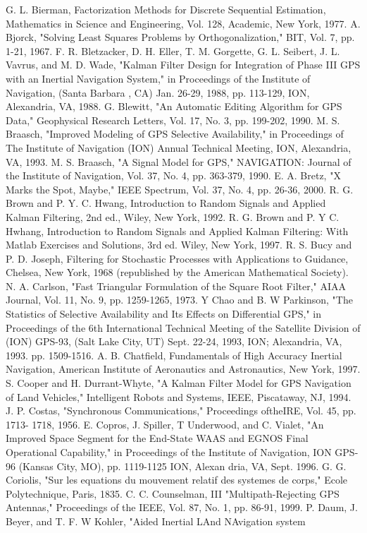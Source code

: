 \begin{thebibliography}{99}
 G. L. Bierman, Factorization Methods for Discrete Sequential Estimation, Mathematics
in Science and Engineering, Vol. 128, Academic, New York, 1977.
 A. Bjorck, "Solving Least Squares Problems by Orthogonalization," BIT, Vol. 7, pp.
1-21, 1967.
 F. R. Bletzacker, D. H. Eller, T. M. Gorgette, G. L. Seibert, J. L. Vavrus, and M. D. Wade,
"Kalman Filter Design for Integration of Phase III GPS with an Inertial Navigation
System," in Proceedings of the Institute of Navigation, (Santa Barbara , CA) Jan. 26-29,
1988, pp. 113-129, ION, Alexandria, VA, 1988.
 G. Blewitt, "An Automatic Editing Algorithm for GPS Data," Geophysical Research
Letters, Vol. 17, No. 3, pp. 199-202, 1990.
 M. S. Braasch, "Improved Modeling of GPS Selective Availability," in Proceedings of
The Institute of Navigation (ION) Annual Technical Meeting, ION, Alexandria, VA,
1993.
 M. S. Braasch, "A Signal Model for GPS," NAVIGATION: Journal of the Institute of
Navigation, Vol. 37, No. 4, pp. 363-379, 1990.
 E. A. Bretz, "X Marks the Spot, Maybe," IEEE Spectrum, Vol. 37, No. 4, pp. 26-36,
2000.
 R. G. Brown and P. Y. C. Hwang, Introduction to Random Signals and Applied Kalman
Filtering, 2nd ed., Wiley, New York, 1992.
 R. G. Brown and P. Y C. Hwhang, Introduction to Random Signals and Applied Kalman
Filtering: With Matlab Exercises and Solutions, 3rd ed. Wiley, New York, 1997.
 R. S. Bucy and P. D. Joseph, Filtering for Stochastic Processes with Applications to
Guidance, Chelsea, New York,   1968  (republished by the American Mathematical
Society).
 N. A. Carlson, "Fast Triangular Formulation of the Square Root Filter," AIAA Journal,
Vol. 11, No. 9, pp. 1259-1265, 1973.
 Y Chao and B. W Parkinson, "The Statistics of Selective Availability and Its Effects on
Differential GPS," in Proceedings of the 6th International Technical Meeting of the
Satellite Division of (ION) GPS-93, (Salt Lake City, UT) Sept. 22-24, 1993, ION;
Alexandria, VA, 1993. pp. 1509-1516.
 A. B. Chatfield, Fundamentals of High Accuracy Inertial Navigation, American Institute
of Aeronautics and Astronautics, New York, 1997.
 S. Cooper and H. Durrant-Whyte, "A Kalman Filter Model for GPS Navigation of Land
Vehicles," Intelligent Robots and Systems, IEEE, Piscataway, NJ, 1994.
 J. P. Costas, "Synchronous Communications," Proceedings oftheIRE, Vol. 45, pp. 1713-
1718, 1956.
 E. Copros, J. Spiller, T Underwood, and C. Vialet, "An Improved Space Segment for the
End-State WAAS and EGNOS Final Operational Capability," in Proceedings of the
Institute of Navigation, ION GPS-96 (Kansas City, MO), pp. 1119-1125 ION, Alexan
dria, VA, Sept. 1996.
 G. G. Coriolis, "Sur les equations du mouvement relatif des systemes de corps," Ecole
Polytechnique, Paris, 1835.
 C. C. Counselman, III "Multipath-Rejecting GPS Antennas," Proceedings of the IEEE,
Vol. 87, No. 1, pp. 86-91, 1999.
 P. Daum, J. Beyer, and T. F. W Kohler, "Aided Inertial LAnd NAvigation system
 

\end{thebibliography}
